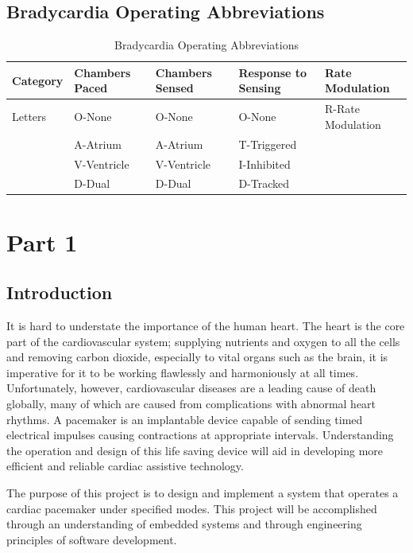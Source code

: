 \documentclass{article}
\begin{document}
\subsection{Bradycardia Operating Abbreviations}
\begin{table}[H]
    \caption{Bradycardia Operating Abbreviations}
    \begin{tabular}{|m{2cm}|m{2cm}|m{2cm}|m{2cm}|m{3cm}|}
        \hline
        \textbf{Category} & \textbf{Chambers Paced} & \textbf{Chambers Sensed} & \textbf{Response to Sensing} & \textbf{Rate Modulation} \\
        \hline 
        Letters     & O-None & O-None & O-None & R-Rate Modulation\\
                    & A-Atrium & A-Atrium & T-Triggered & \\
                    & V-Ventricle & V-Ventricle & I-Inhibited & \\
                    & D-Dual & D-Dual & D-Tracked & \\
        \hline
    \end{tabular}
\end{table}
\newpage
\section{Part 1}

\subsection{Introduction}

It is hard to understate the importance of the human heart. The heart is the core part of the cardiovascular system; supplying nutrients and oxygen to all the cells
and removing carbon dioxide, especially to vital organs such as the brain, it is imperative for it to be working flawlessly and harmoniously at all times.
Unfortunately, however, cardiovascular diseases are a leading cause of death globally, many of which are caused from complications with 
abnormal heart rhythms. A pacemaker is an implantable device capable of sending timed electrical impulses causing contractions at 
appropriate intervals. Understanding the operation and design of this life saving device will aid in developing 
more efficient and reliable cardiac assistive technology. 

The purpose of this project is to design and implement a system that operates a cardiac pacemaker 
under specified modes. This project will be accomplished through an understanding of embedded systems and through engineering 
principles of software development. 
\end{document}
